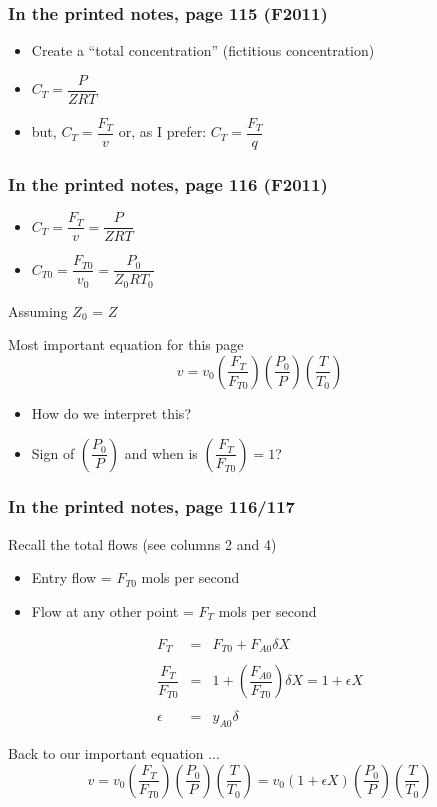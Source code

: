\begin{frame}\frametitle{In the printed notes, page 115 (F2011)}
	\begin{itemize}
		\item	Create a ``total concentration'' {\scriptsize (fictitious concentration)}
		\item	$C_T = \dfrac{P}{ZRT}$
		\item	but, $C_T = \dfrac{F_T}{v}$ or, as I prefer: $C_T = \dfrac{F_T}{q}$
	\end{itemize}
\end{frame}

\begin{frame}\frametitle{In the printed notes, page 116 (F2011)}
	\begin{itemize}
		\item	$C_T = \dfrac{F_T}{v} = \dfrac{P}{ZRT}$ {\footnotesize\hfill {\color{myOrange}{$\leftarrow$ applies anywhere along the reactor}}}
		\item	$C_{T0} = \dfrac{F_{T0}}{v_0} = \dfrac{P_0}{Z_0RT_0}$ {\footnotesize\hfill {\color{myOrange}{$\leftarrow$ applies only at the feed point}}}
	\end{itemize}
	Assuming $Z_0$ = $Z$
	\begin{exampleblock}{Most important equation for this page}
		$$v = v_0 \left(\dfrac{F_T}{F_{T0}}\right)\left(\dfrac{P_0}{P}\right)\left(\dfrac{T}{T_{0}}\right)$$
	\end{exampleblock}
	\begin{itemize}
		\item	How do we interpret this?
		\item	Sign of $\left(\dfrac{P_0}{P}\right)$ and when is $\left(\dfrac{F_T}{F_{T0}}\right)=1$?
	\end{itemize}
	
\end{frame}

\begin{frame}\frametitle{In the printed notes, page 116/117}
	Recall the total flows (see columns 2 and 4)
	\begin{itemize}
		\item	Entry flow = $F_{T0}$ mols per second
		\item	Flow at any other point = $F_T$ mols per second
	\end{itemize}
	$$\begin{array}{rcl}
		F_T &=& F_{T0}+ F_{A0}\delta X \\ \\
		\dfrac{F_T}{ F_{T0}} &=& 1 + \left(\dfrac{F_{A0}}{F_{T0}}\right)\delta X = 1 + \epsilon X \\ \\
		\epsilon &=& y_{A0} \delta
	\end{array} 
	$$
	\begin{exampleblock}{Back to our important equation ...}
		\small
		$$v = v_0 \left(\dfrac{F_T}{F_{T0}}\right)\left(\dfrac{P_0}{P}\right)\left(\dfrac{T}{T_{0}}\right) = v_0 \left(1 + \epsilon X\right)\left(\dfrac{P_0}{P}\right)\left(\dfrac{T}{T_{0}}\right) $$
	\end{exampleblock}	
\end{frame}

